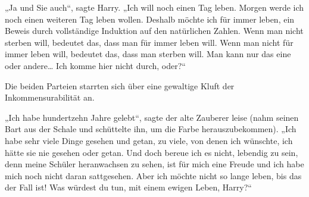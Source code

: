 „Ja und Sie auch“, sagte Harry. „Ich will noch einen Tag leben. Morgen werde ich noch einen weiteren Tag leben wollen. Deshalb möchte ich für immer leben, ein Beweis durch vollständige Induktion auf den natürlichen Zahlen. Wenn man nicht sterben will, bedeutet das, dass man für immer leben will. Wenn man nicht für immer leben will, bedeutet das, dass man sterben will. Man kann nur das eine oder andere… Ich komme hier nicht durch, oder?“

Die beiden Parteien starrten sich über eine gewaltige Kluft der Inkommensurabilität an.%

„Ich habe hundertzehn Jahre gelebt“, sagte der alte Zauberer leise (nahm seinen Bart aus der Schale und schüttelte ihn, um die Farbe herauszubekommen). „Ich habe sehr viele Dinge gesehen und getan, zu viele, von denen ich wünschte, ich hätte sie nie gesehen oder getan. Und doch bereue ich es nicht, lebendig zu sein, denn meine Schüler heranwachsen zu sehen, ist für mich eine Freude und ich habe mich noch nicht daran sattgesehen. Aber ich möchte nicht so lange leben, bis das der Fall ist! Was würdest du tun, mit einem ewigen Leben, Harry?“

